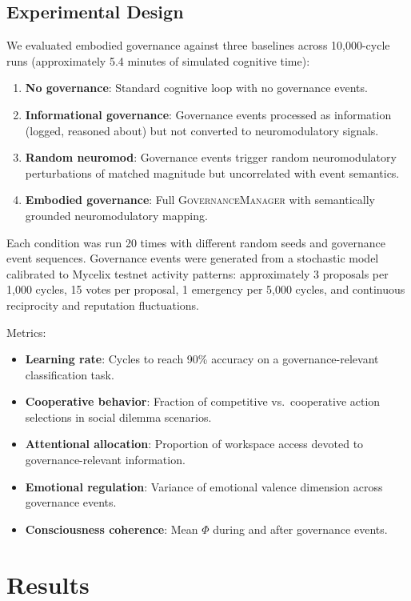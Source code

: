 \documentclass[11pt,a4paper]{article}
\begin{document}
\subsection{Experimental Design}

We evaluated embodied governance against three baselines across 10,000-cycle runs (approximately 5.4 minutes of simulated cognitive time):

\begin{enumerate}
  \item \textbf{No governance}: Standard cognitive loop with no governance events.
  \item \textbf{Informational governance}: Governance events processed as information (logged, reasoned about) but not converted to neuromodulatory signals.
  \item \textbf{Random neuromod}: Governance events trigger random neuromodulatory perturbations of matched magnitude but uncorrelated with event semantics.
  \item \textbf{Embodied governance}: Full \textsc{GovernanceManager} with semantically grounded neuromodulatory mapping.
\end{enumerate}

Each condition was run 20 times with different random seeds and governance event sequences.
Governance events were generated from a stochastic model calibrated to Mycelix testnet activity patterns: approximately 3 proposals per 1,000 cycles, 15 votes per proposal, 1 emergency per 5,000 cycles, and continuous reciprocity and reputation fluctuations.

Metrics:
\begin{itemize}
  \item \textbf{Learning rate}: Cycles to reach 90\% accuracy on a governance-relevant classification task.
  \item \textbf{Cooperative behavior}: Fraction of competitive vs.\ cooperative action selections in social dilemma scenarios.
  \item \textbf{Attentional allocation}: Proportion of workspace access devoted to governance-relevant information.
  \item \textbf{Emotional regulation}: Variance of emotional valence dimension across governance events.
  \item \textbf{Consciousness coherence}: Mean $\Phi$ during and after governance events.
\end{itemize}

\section{Results}
\label{sec:results}
\end{document}
